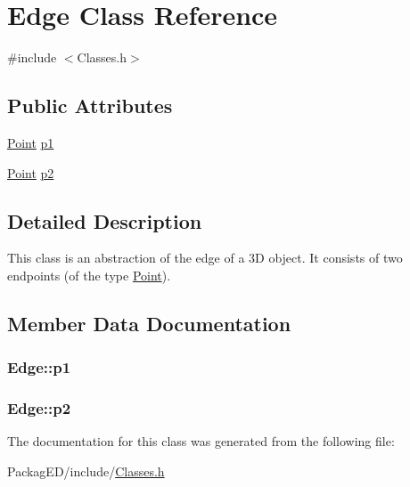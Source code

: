 \hypertarget{class_edge}{}\section{Edge Class Reference}
\label{class_edge}


{\ttfamily \#include $<$Classes.\+h$>$}

\subsection*{Public Attributes}
\begin{DoxyCompactItemize}
\item 
\hyperlink{class_point}{Point} \hyperlink{class_edge_a9cb958550d6ca42fd7122235d64898c9}{p1}
\item 
\hyperlink{class_point}{Point} \hyperlink{class_edge_a0867d7b428491ef61eb90b540a73db1d}{p2}
\end{DoxyCompactItemize}


\subsection{Detailed Description}
This class is an abstraction of the edge of a 3D object. It consists of two endpoints (of the type \hyperlink{class_point}{Point}). 

\subsection{Member Data Documentation}
\subsubsection[{\texorpdfstring{p1}{p1}}]{ Edge\+::p1}\hypertarget{class_edge_a9cb958550d6ca42fd7122235d64898c9}{}\label{class_edge_a9cb958550d6ca42fd7122235d64898c9}
\subsubsection[{\texorpdfstring{p2}{p2}}]{ Edge\+::p2}\hypertarget{class_edge_a0867d7b428491ef61eb90b540a73db1d}{}\label{class_edge_a0867d7b428491ef61eb90b540a73db1d}


The documentation for this class was generated from the following file\+:\begin{DoxyCompactItemize}
\item 
Packag\+E\+D/include/\hyperlink{_classes_8h}{Classes.\+h}\end{DoxyCompactItemize}
